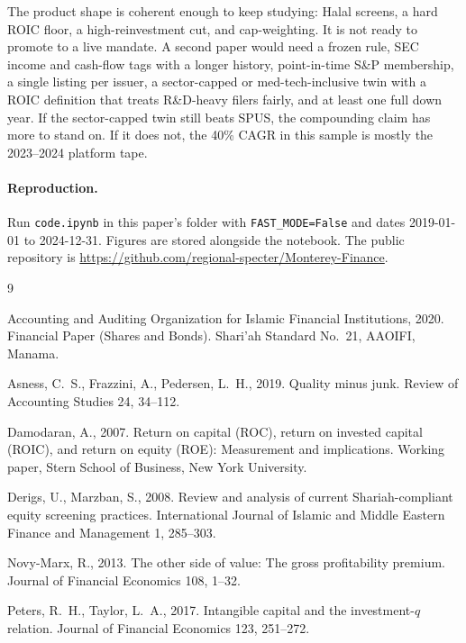 \documentclass[11pt,letterpaper]{article}
\begin{document}
The product shape is coherent enough to keep studying: Halal screens, a hard ROIC floor, a high-reinvestment cut, and cap-weighting. It is not ready to promote to a live mandate. A second paper would need a frozen rule, SEC income and cash-flow tags with a longer history, point-in-time S\&P membership, a single listing per issuer, a sector-capped or med-tech-inclusive twin with a ROIC definition that treats R\&D-heavy filers fairly, and at least one full down year. If the sector-capped twin still beats SPUS, the compounding claim has more to stand on. If it does not, the 40\% CAGR in this sample is mostly the 2023--2024 platform tape.

\paragraph{Reproduction.}
Run \texttt{code.ipynb} in this paper's folder with \texttt{FAST\_MODE=False} and dates 2019-01-01 to 2024-12-31. Figures are stored alongside the notebook. The public repository is \url{https://github.com/regional-specter/Monterey-Finance}.


\begin{thebibliography}{9}

Accounting and Auditing Organization for Islamic Financial Institutions, 2020.
\newblock Financial Paper (Shares and Bonds).
\newblock Shari'ah Standard No.~21, AAOIFI, Manama.

Asness, C.~S., Frazzini, A., Pedersen, L.~H., 2019.
\newblock Quality minus junk.
\newblock Review of Accounting Studies 24, 34--112.

Damodaran, A., 2007.
\newblock Return on capital (ROC), return on invested capital (ROIC), and return on equity (ROE): Measurement and implications.
\newblock Working paper, Stern School of Business, New York University.

Derigs, U., Marzban, S., 2008.
\newblock Review and analysis of current Shariah-compliant equity screening practices.
\newblock International Journal of Islamic and Middle Eastern Finance and Management 1, 285--303.

Novy-Marx, R., 2013.
\newblock The other side of value: The gross profitability premium.
\newblock Journal of Financial Economics 108, 1--32.

Peters, R.~H., Taylor, L.~A., 2017.
\newblock Intangible capital and the investment-$q$ relation.
\newblock Journal of Financial Economics 123, 251--272.

\end{thebibliography}
\end{document}
